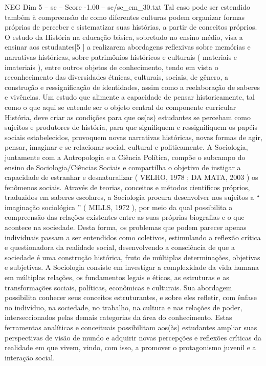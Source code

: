\begin{textsample}{NEG Dim 5 – sc – Score -1.00 – sc/sc\_em\_30.txt}
Tal caso pode ser estendido também à compreensão de como diferentes culturas podem organizar formas próprias de perceber e sistematizar suas histórias, a partir de conceitos próprios.
O estudo da História na educação básica, sobretudo no ensino médio, visa a ensinar aos estudantes[5 ] a realizarem abordagens reflexivas sobre memórias e narrativas históricas, sobre patrimônios históricos e culturais ( materiais e imateriais ), entre outros objetos de conhecimento, tendo em vista o reconhecimento das diversidades étnicas, culturais, sociais, de gênero, a construção e ressignificação de identidades, assim como a reelaboração de saberes e vivências.
Um estudo que alimente a capacidade de pensar historicamente, tal como o que aqui se entende ser o objeto central do componente curricular História, deve criar as condições para que os(as) estudantes se percebam como sujeitos e produtores de história, para que signifiquem e ressignifiquem os papéis sociais estabelecidos, provoquem novas narrativas históricas, novas formas de agir, pensar, imaginar e se relacionar social, cultural e politicamente.
A Sociologia, juntamente com a Antropologia e a Ciência Política, compõe o subcampo do ensino de Sociologia/Ciências Sociais e compartilha o objetivo de instigar a capacidade de estranhar e desnaturalizar ( VELHO, 1978 ; DA MATA, 2003 ) os fenômenos sociais.
Através de teorias, conceitos e métodos científicos próprios, traduzidos em saberes escolares, a Sociologia procura desenvolver nos sujeitos a “ imaginação sociológica ” ( MILLS, 1972 ), por meio da qual possibilita a compreensão das relações existentes entre as suas próprias biografias e o que acontece na sociedade.
Desta forma, os problemas que podem parecer apenas individuais passam a ser entendidos como coletivos, estimulando a reflexão crítica e questionadora da realidade social, desenvolvendo a consciência de que a sociedade é uma construção histórica, fruto de múltiplas determinações, objetivas e subjetivas.
A Sociologia consiste em investigar a complexidade da vida humana em múltiplas relações, os fundamentos legais e éticos, as estruturas e as transformações sociais, políticas, econômicas e culturais.
Sua abordagem possibilita conhecer seus conceitos estruturantes, e sobre eles refletir, com ênfase no indivíduo, na sociedade, no trabalho, na cultura e nas relações de poder, interseccionados pelas demais categorias da área do conhecimento.
Estas ferramentas analíticas e conceituais possibilitam aos(às) estudantes ampliar suas perspectivas de visão de mundo e adquirir novas percepções e reflexões críticas da realidade em que vivem, vindo, com isso, a promover o protagonismo juvenil e a interação social.

\end{textsample}
